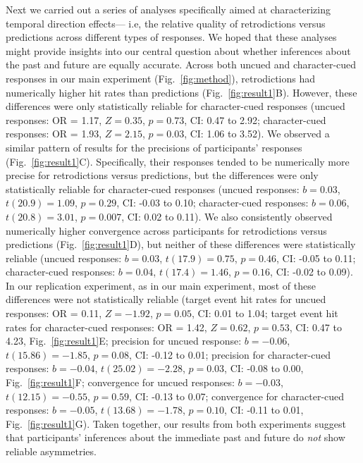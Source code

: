 \documentclass[10pt]{article}
\begin{document}
Next we carried out a series of analyses specifically aimed at characterizing temporal direction effects--- i.e, the relative quality of retrodictions versus predictions across different types of responses. We hoped that these analyses might provide insights into our central question about whether inferences about the past and future are equally accurate. Across both uncued and character-cued responses in our main experiment (Fig.~\ref{fig:method}), retrodictions had numerically higher hit rates than predictions (Fig.~\ref{fig:result1}B). However, these differences were only statistically reliable for character-cued responses (uncued responses: OR = 1.17, $Z = 0.35$, $p = 0.73$, CI: 0.47 to 2.92; character-cued responses: OR = 1.93, $Z = 2.15$, $p = 0.03$, CI: 1.06 to 3.52). We observed a similar pattern of results for the precisions of participants' responses (Fig.~\ref{fig:result1}C). Specifically, their responses tended to be numerically more precise for retrodictions versus predictions, but the differences were only statistically reliable for character-cued responses (uncued responses: $b = 0.03$, $t(20.9) = 1.09$, $p = 0.29$, CI: -0.03 to 0.10; character-cued responses: $b = 0.06$, $t(20.8) = 3.01$, $p = 0.007$, CI: 0.02 to 0.11). We also consistently observed numerically higher convergence across participants for retrodictions versus predictions (Fig.~\ref{fig:result1}D), but neither of these differences were statistically reliable (uncued responses: $b = 0.03$, $t(17.9) = 0.75$, $p = 0.46$, CI: -0.05 to 0.11; character-cued responses: $b = 0.04$, $t(17.4) = 1.46$, $p = 0.16$, CI: -0.02 to 0.09).  In our replication experiment, as in our main experiment, most of these differences were not statistically reliable (target event hit rates for uncued responses: OR = 0.11, $Z = -1.92$, $p = 0.05$, CI: 0.01 to 1.04; target event hit rates for character-cued responses: OR = 1.42, $Z = 0.62$, $p = 0.53$, CI: 0.47 to 4.23, Fig.~\ref{fig:result1}E; precision for uncued response: $b = -0.06$, $t(15.86) = -1.85$, $p = 0.08$, CI: -0.12 to 0.01; precision for character-cued responses: $b = -0.04$, $t(25.02) = -2.28$, $p = 0.03$, CI: -0.08 to 0.00, Fig.~\ref{fig:result1}F; convergence for uncued responses: $b = -0.03$, $t(12.15) = -0.55$, $p = 0.59$, CI: -0.13 to 0.07; convergence for character-cued responses: $b = -0.05$, $t(13.68) = -1.78$, $p = 0.10$, CI: -0.11 to 0.01, Fig.~\ref{fig:result1}G).  Taken together, our results from both experiments suggest that participants’ inferences about the immediate past and future do \textit{not} show reliable asymmetries.
\end{document}
